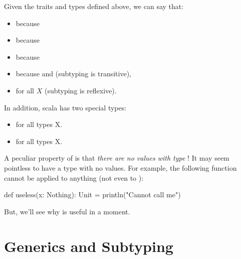 \documentclass[9pt]{extbook}
\begin{document}
Given the traits and types defined above, we can say that:
\begin{itemize}

  \item {} because 

  \item {} because 

  \item {} because 

  \item {} because  and
   (subtyping is transitive),

  \item {} for all $X$ (subtyping is reflexive).

\end{itemize}
%
In addition, scala has two special types:
%
\begin{itemize}

  \item {} for all types X.

  \item {} for all types X.

\end{itemize}

A peculiar property of  is that
\emph{there are no values with type} !
It may seem pointless to have a type with no values. For example, the following
function cannot be applied to anything (not even to ):
\begin{scalacode}
def useless(x: Nothing): Unit = {
  println("Cannot call me")
}
\end{scalacode}

But, we'll see why  is useful in a moment.

\section{Generics and Subtyping}
\end{document}
